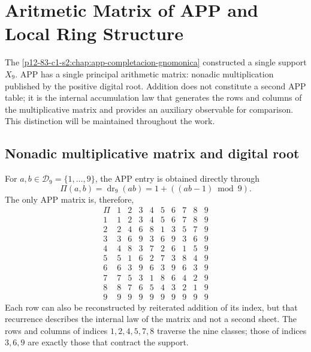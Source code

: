 \label{chap:83-01}

\begingroup
\def\HMTAPPFormal{1}
\def\HMTAPPDevelopments{1}
\begin{HMTScientificOwnerSubordinated}

\end{HMTScientificOwnerSubordinated}
\endgroup


\section{Aritmetic Matrix of APP and Local Ring Structure}
\label{p12-83-c1-s1:chap:app-hojas-algebra-local}

The \cref{p12-83-c1-s2:chap:app-completacion-gnomonica} constructed a single support
\(X_9\). APP has a single principal arithmetic matrix: nonadic multiplication
published by the positive digital root. Addition does not constitute a
second APP table; it is the internal accumulation law that generates the rows and
columns of the multiplicative matrix and provides an auxiliary observable for
comparison. This distinction will be maintained throughout the work.

\subsection{Nonadic multiplicative matrix and digital root}

For \(a,b\in\mathcal D_9=\{1,\ldots,9\}\), the APP entry is obtained
directly through
\begin{equation}
 \boxed{\Pi(a,b)=\operatorname{dr}_9(ab)
 =1+((ab-1)\bmod9).}
 \label{p12-83-c1-s1:eq:app-matriz-multiplicativa-directa}
\end{equation}
The only APP matrix is, therefore,
\[
\begin{array}{c|ccccccccc}
\Pi&1&2&3&4&5&6&7&8&9\\\hline
1&1&2&3&4&5&6&7&8&9\\
2&2&4&6&8&1&3&5&7&9\\
3&3&6&9&3&6&9&3&6&9\\
4&4&8&3&7&2&6&1&5&9\\
5&5&1&6&2&7&3&8&4&9\\
6&6&3&9&6&3&9&6&3&9\\
7&7&5&3&1&8&6&4&2&9\\
8&8&7&6&5&4&3&2&1&9\\
9&9&9&9&9&9&9&9&9&9
\end{array}
\]
Each row can also be reconstructed by reiterated addition of its index,
but that recurrence describes the internal law of the matrix and not a second
sheet. The rows and columns of indices \(1,2,4,5,7,8\) traverse the nine
classes; those of indices \(3,6,9\) are exactly those that contract the support.

